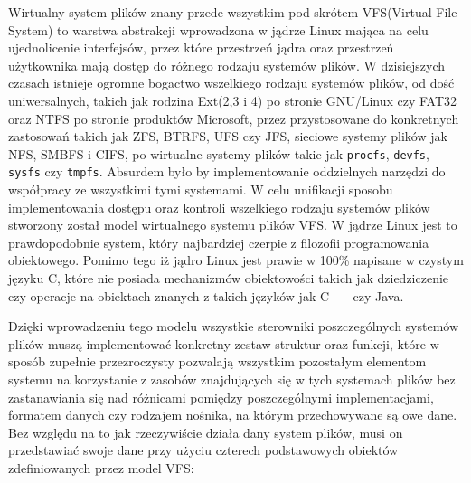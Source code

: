 \documentclass[10pt]{scrartcl}
\begin{document}
Wirtualny system plików znany przede wszystkim pod skrótem VFS(Virtual File System) to warstwa abstrakcji wprowadzona w jądrze Linux mająca na celu ujednolicenie interfejsów, przez które przestrzeń jądra oraz przestrzeń użytkownika mają dostęp do różnego rodzaju systemów plików. W dzisiejszych czasach istnieje ogromne bogactwo wszelkiego rodzaju systemów plików, od dość uniwersalnych, takich jak rodzina Ext(2,3 i 4) po stronie GNU/Linux czy FAT32 oraz NTFS po stronie produktów Microsoft, przez przystosowane do konkretnych zastosowań takich jak ZFS, BTRFS, UFS czy JFS, sieciowe systemy plików jak NFS, SMBFS i CIFS, po wirtualne systemy plików takie jak \texttt{procfs}, \texttt{devfs}, \texttt{sysfs} czy \texttt{tmpfs}. Absurdem było by implementowanie oddzielnych narzędzi do współpracy ze wszystkimi tymi systemami. W celu unifikacji sposobu implementowania dostępu oraz kontroli wszelkiego rodzaju systemów plików stworzony został model wirtualnego systemu plików VFS\@. W jądrze Linux jest to prawdopodobnie system, który najbardziej czerpie z filozofii programowania obiektowego. Pomimo tego iż jądro Linux jest prawie w 100\% napisane w czystym języku C, które nie posiada mechanizmów obiektowości takich jak dziedziczenie czy operacje na obiektach znanych z takich języków jak C++ czy Java.

Dzięki wprowadzeniu tego modelu wszystkie sterowniki poszczególnych systemów plików muszą implementować konkretny zestaw struktur oraz funkcji, które w sposób zupełnie przezroczysty pozwalają wszystkim pozostałym elementom systemu na korzystanie z zasobów znajdujących się w tych systemach plików bez zastanawiania się nad różnicami pomiędzy poszczególnymi implementacjami, formatem danych czy rodzajem nośnika, na którym przechowywane są owe dane. Bez względu na to jak rzeczywiście działa dany system plików, musi on przedstawiać swoje dane przy użyciu czterech podstawowych obiektów zdefiniowanych przez model VFS:
\end{document}
